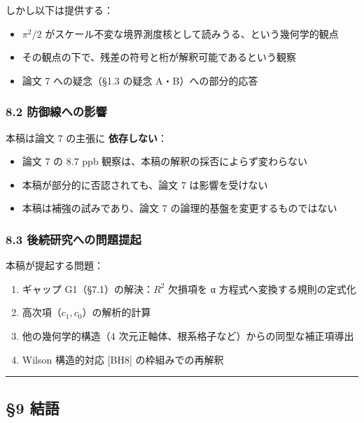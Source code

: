 \documentclass[
]{article}
\providecommand{\tightlist}{%
  \setlength{\itemsep}{0pt}\setlength{\parskip}{0pt}}
\begin{document}
しかし以下は提供する：

\begin{itemize}
\tightlist
\item
  \(\pi^2/2\)
  がスケール不変な境界測度核として読みうる、という幾何学的観点
\item
  その観点の下で、残差の符号と桁が解釈可能であるという観察
\item
  論文 7 への疑念（§1.3 の疑念 A・B）への部分的応答
\end{itemize}

\subsubsection{8.2
防御線への影響}\label{ux9632ux5fa1ux7ddaux3078ux306eux5f71ux97ff}

本稿は論文 7 の主張に \textbf{依存しない}：

\begin{itemize}
\tightlist
\item
  論文 7 の 8.7 ppb 観察は、本稿の解釈の採否によらず変わらない
\item
  本稿が部分的に否認されても、論文 7 は影響を受けない
\item
  本稿は補強の試みであり、論文 7 の論理的基盤を変更するものではない
\end{itemize}

\subsubsection{8.3
後続研究への問題提起}\label{ux5f8cux7d9aux7814ux7a76ux3078ux306eux554fux984cux63d0ux8d77}

本稿が提起する問題：

\begin{enumerate}
\def\labelenumi{\arabic{enumi}.}
\tightlist
\item
  ギャップ G1（§7.1）の解決：\(R^2\) 欠損項を α
  方程式へ変換する規則の定式化
\item
  高次項（\(c_1, c_0\)）の解析的計算
\item
  他の幾何学的構造（4 次元正軸体、根系格子など）からの同型な補正項導出
\item
  Wilson 構造的対応 {[}BH8{]} の枠組みでの再解釈
\end{enumerate}

\begin{center}\rule{0.5\linewidth}{0.5pt}\end{center}

\subsection{§9 結語}\label{ux7d50ux8a9e}
\end{document}
